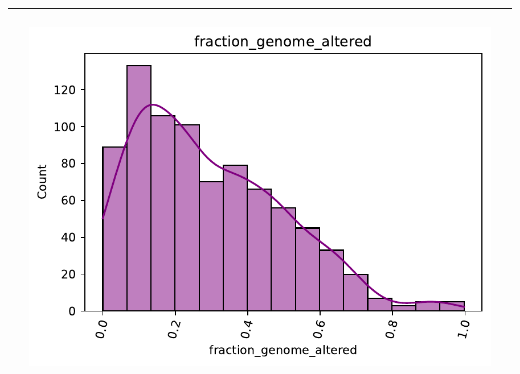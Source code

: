\begin{table}[!htb]
\begin{threeparttable}
\begin{tabular}{p{2.5cm} p{7cm} p{6.5cm}}
			& \begin{center}\includegraphics[width=1\linewidth]{NOTEBOOK/IMAGENES_DESCRIPTIVAS/14_fraction_genome_altered}\end{center}
			\\ \hline
			
		\end{tabular}
	\end{threeparttable}
\end{table}

